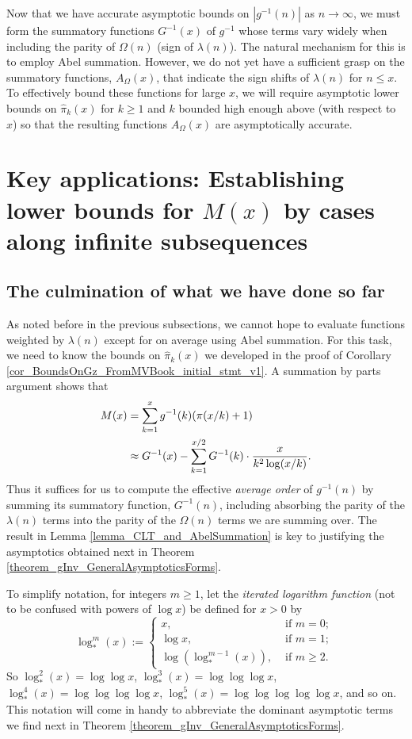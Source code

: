 \documentclass[11pt,reqno,a4letter]{article}
\numberwithin{figure}{section}
\numberwithin{table}{section}
\theoremstyle{plain}
\numberwithin{theorem}{section}
\theoremstyle{definition}
\begin{document}
Now that we have accurate asymptotic bounds on $|g^{-1}(n)|$ as $n \rightarrow \infty$, we must form the 
summatory functions $G^{-1}(x)$ of $g^{-1}$ whose terms vary widely when including the parity of 
$\Omega(n)$ (sign of $\lambda(n)$). The natural mechanism for this is to employ Abel summation. 
However, we do not yet have a sufficient grasp on the summatory functions, 
$A_{\Omega}(x)$, that indicate the sign shifts of $\lambda(n)$ for $n \leq x$. 
To effectively bound these functions for large $x$, we will require asymptotic lower bounds 
on $\widehat{\pi}_k(x)$ for $k \geq 1$ and $k$ bounded high enough above (with respect to $x$) so that 
the resulting functions $A_{\Omega}(x)$ are asymptotically accurate. 

\newpage
\section{Key applications: Establishing lower bounds for $M(x)$ by cases along infinite subsequences} 
\label{Section_KeyApplications} 

\subsection{The culmination of what we have done so far} 

As noted before in the previous subsections, we cannot hope to evaluate
functions weighted by $\lambda(n)$ except for on 
average using Abel summation. For this task, 
we need to know the bounds on $\widehat{\pi}_k(x)$ we developed in the 
proof of Corollary \ref{cor_BoundsOnGz_FromMVBook_initial_stmt_v1}. 
A summation by parts argument shows that 
\begin{align} 
\notag
M(x) & = \sum_{k=1}^{x} g^{-1}(k) (\pi(x/k)+1) \\ 
\label{eqn_pf_tag_v2-restated_v2} 
     & \approx G^{-1}(x) - \sum_{k=1}^{x/2} G^{-1}(k) \cdot \frac{x}{k^2 \log(x/k)}. 
\end{align} 
Thus it suffices for us to compute the effective \emph{average order} of $g^{-1}(n)$ 
by summing its summatory function, $G^{-1}(n)$, including absorbing the parity of the 
$\lambda(n)$ terms into the parity of the $\Omega(n)$ terms we are summing over. 
The result in Lemma \ref{lemma_CLT_and_AbelSummation} is key to justifying the 
asymptotics obtained next in Theorem \ref{theorem_gInv_GeneralAsymptoticsForms}. 

To simplify notation, for integers $m \geq 1$, let the \emph{iterated logarithm function} 
(not to be confused with powers of $\log x$) be defined for $x > 0$ by 
\[
\log_{\ast}^{m}(x) := \begin{cases} 
     x, & \text{ if $m = 0$; } \\ 
     \log x, & \text{ if $m = 1$; } \\ 
     \log\left(\log_{\ast}^{m-1}(x)\right), & \text{ if $m \geq 2$. } 
     \end{cases}
\]
So $\log_{\ast}^2(x) = \log\log x$, $\log_{\ast}^3(x) = \log\log\log x$, 
$\log_{\ast}^4(x) = \log\log\log\log x$, $\log_{\ast}^5(x) = \log\log\log\log\log x$, and so on. 
This notation will come in handy to abbreviate the dominant asymptotic terms we find next in 
Theorem \ref{theorem_gInv_GeneralAsymptoticsForms}. 
\end{document}
